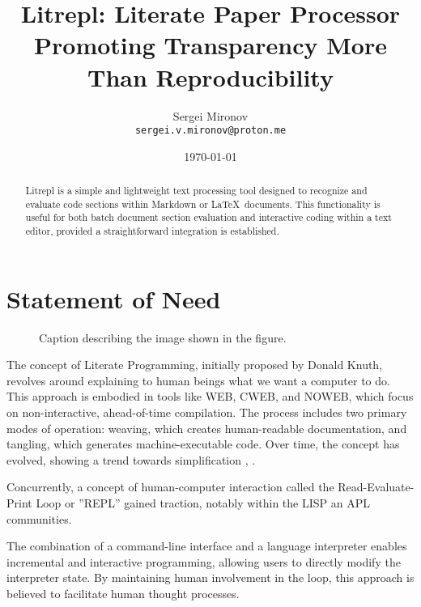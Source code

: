 \documentclass[letterpaper,12pt,twocolumn]{article}
\title{Litrepl: Literate Paper Processor Promoting Transparency More Than Reproducibility}
\author{Sergei Mironov \\
        \texttt{sergei.v.mironov@proton.me}}
\date{\today}
\newcommand{\Latex}{\LaTeX\ }
\begin{document}
\maketitle

\begin{abstract}

Litrepl is a simple and lightweight text processing tool designed to recognize
and evaluate code sections within Markdown or \Latex documents. This
functionality is useful for both batch document section evaluation and
interactive coding within a text editor, provided a straightforward integration
is established.

\end{abstract}

\section{Statement of Need}

\begin{figure*}[!hbt]
  \centering
  
  \caption{Caption describing the image shown in the figure.}
  \label{fig:resource-allocation}
\end{figure*}

The concept of Literate Programming, initially proposed by Donald Knuth,
revolves around explaining to human beings what we want a computer to do. This
approach is embodied in tools like WEB, CWEB, and NOWEB, which focus on
non-interactive, ahead-of-time compilation. The process includes two primary
modes of operation: weaving, which creates human-readable documentation, and
tangling, which generates machine-executable code. Over time, the concept has
evolved, showing a trend towards simplification \textcite{Knuth1984lp},
\textcite{Ramsey1994lps}.

Concurrently, a concept of human-computer interaction called the
Read-Evaluate-Print Loop or ''REPL'' gained traction, notably within the LISP an
APL communities.\textcite{Spence1975apl, McCarthy1959recfun, Iverson1962apl}

The combination of a command-line interface and a language interpreter enables
incremental and interactive programming, allowing users to directly modify the
interpreter state. By maintaining human involvement in the loop, this approach
is believed to facilitate human thought processes.
\end{document}
